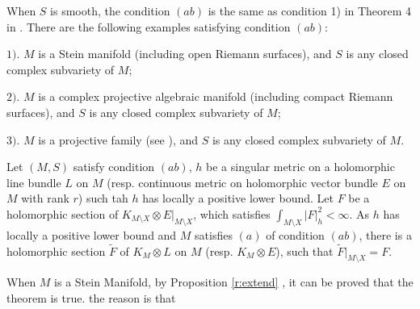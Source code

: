   When $S$ is smooth, the condition $(ab)$ is the same as condition 1)
  in Theorem 4 in \cite{ohsawa5}. There are the following examples
  satisfying condition $(ab)$:
  
  $1).$ $M$ is a Stein manifold (including open Riemann surfaces),
  and $S$ is any closed complex subvariety of $M$;
  
  $2).$ $M$ is a complex projective algebraic manifold (including
  compact Riemann surfaces), and $S$ is any closed complex subvariety
  of $M$;
  
  $3).$ $M$ is a projective family (see \cite{siu00}),
  and $S$ is any closed complex subvariety of $M$.

\begin{proposition}[][][r:extend]
  Let $(M,S)$ satisfy condition $(ab)$, $h$ be a
  singular metric on a holomorphic line bundle $L$ on $M$ (resp.
  continuous metric on holomorphic vector bundle $E$ on $M$ with rank
  $r$) such tah $h$ has locally a positive lower bound. Let $F$ be a
  holomorphic section of $K_{M\setminus X}\otimes E|_{M\setminus X}$,
  which satisfies $\int_{M\setminus X}|F|^{2}_{h}<\infty$. As $h$ has
  locally a positive lower bound and \textcolor{purple4}{$M$ satisfies $(a)$ of condition
  $(ab)$, there is a holomorphic section $\widetilde{F}$ of $K_{M}\otimes
  L$ on $M$ (resp. $K_{M}\otimes E$), such that
  $\widetilde{F}|_{M\setminus X}=F$.}
  \end{proposition}

When $M$ is a Stein Manifold, by Proposition \ref{r:extend} , it can be proved that the theorem is true. the reason is that 

